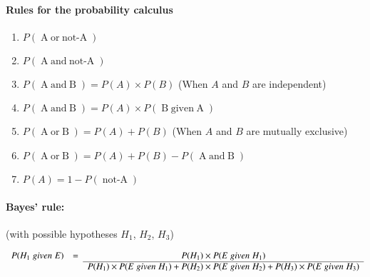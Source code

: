 \documentclass[10pt]{article}
\newcommand\negate[1]{\mathop{\mbox{$not$-$#1$}}}
\newcommand\disjoin[2]{\mathop{\mbox{$#1\; or\; #2$}}}
\newcommand\conjoin[2]{\mathop{\mbox{$#1\; and\; #2$}}}
\newcommand\given[2]{\mathop{\mbox{$#1\; given\; #2$}}}
\begin{document}
\vspace{5cm}

\paragraph{Rules for the probability calculus}

\begin{enumerate}
 \item $P(\disjoin{A}{\negate{A}})$
 \item $P(\conjoin{A}{\negate{A}})$
 \item $P(\conjoin{A}{B}) = P(A) \times P(B)$ \hspace{2cm} (When $A$ and $B$ are independent)
 \item $P(\conjoin{A}{B}) = P(A) \times P(\given{B}{A})$
 \item $P(\disjoin{A}{B}) =P(A) + P(B)$ \hspace{2cm} (When $A$ and $B$ are mutually exclusive)
 \item $P(\disjoin{A}{B}) =P(A) + P(B) - P(\conjoin{A}{B})$
 \item $P(A) = 1 -P(\negate{A})$
\end{enumerate}

\paragraph{Bayes' rule:}(with possible hypotheses $H_1$, $H_2$, $H_3$)

$\begin{array}{ccc}
P(H_1\; given\; E) & = & P(H_1) \times P(E\; given\; H_1) \\ \cline{3-3}
 & & P(H_1)\times P(E\;given\; H_1)+ P(H_2)\times P(E\;given\; H_2)+ P(H_3)\times P(E\;given\; H_3) \\
  \end{array}$
\end{document}
